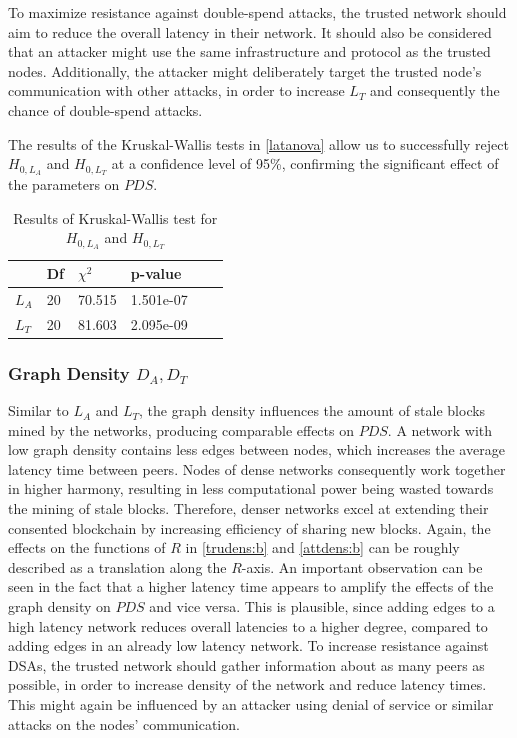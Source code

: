 \documentclass[a4paper,12pt,twoside]{report}
\begin{document}
To maximize resistance against double-spend attacks, the trusted network should aim to reduce the overall latency in their network. It should also be considered that an attacker might use the same infrastructure and protocol as the trusted nodes. Additionally, the attacker might deliberately target the trusted node's communication with other attacks, in order to increase $L_{T}$ and consequently the chance of double-spend attacks.

The results of the Kruskal-Wallis tests in \autoref{latanova} allow us to successfully reject $H_{0,L_A}$ and $H_{0,L_T}$ at a confidence level of 95\%, confirming the significant effect of the parameters on $PDS$.
\begin{table}[hb]
\centering
\begin{tabular}{|l|l|l|l|l|l|} \hline
& Df & $\chi^{2}$ & p-value \\ \hline
$L_A$ & 20 &  70.515 & 1.501e-07 \\ \hline
$L_T$ & 20 &  81.603 & 2.095e-09 \\ \hline
\end{tabular}
\caption{Results of Kruskal-Wallis test for $H_{0,L_A}$ and $H_{0,L_T}$}
\label{latanova}
\end{table}

\subsubsection{Graph Density $D_{A},D_T$}
Similar to $L_{A}$ and $L_{T}$, the graph density influences the amount of stale blocks mined by the networks, producing comparable effects on $PDS$. A network with low graph density contains less edges between nodes, which increases the average latency time between peers. Nodes of dense networks consequently work together in higher harmony, resulting in less computational power being wasted towards the mining of stale blocks. Therefore, denser networks excel at extending their consented blockchain by increasing efficiency of sharing new blocks. Again, the effects on the functions of $R$ in \autoref{trudens:b} and \autoref{attdens:b} can be roughly described as a translation along the $R$-axis. An important observation can be seen in the fact that a higher latency time appears to amplify the effects of the graph density on $PDS$ and vice versa. This is plausible, since adding edges to a high latency network reduces overall latencies to a higher degree, compared to adding edges in an already low latency network. To increase resistance against DSAs, the trusted network should gather information about as many peers as possible, in order to increase density of the network and reduce latency times. This might again be influenced by an attacker using denial of service or similar attacks on the nodes' communication.
\end{document}
